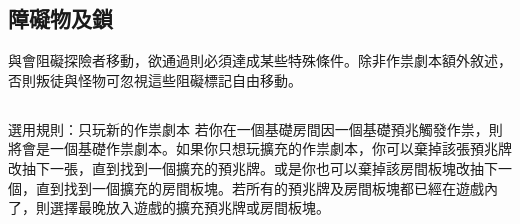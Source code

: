 
\subsection{障礙物及鎖}

與會阻礙探險者移動，欲通過則必須達成某些特殊條件。除非作祟劇本額外敘述，否則叛徒與怪物可忽視這些阻礙標記自由移動。


\subsection*{}

\begin{RuleBox}{選用規則：只玩新的作祟劇本}
  若你在一個基礎房間因一個基礎預兆觸發作祟，則將會是一個基礎作祟劇本。如果你只想玩擴充的作祟劇本，你可以棄掉該張預兆牌改抽下一張，直到找到一個擴充的預兆牌。或是你也可以棄掉該房間板塊改抽下一個，直到找到一個擴充的房間板塊。若所有的預兆牌及房間板塊都已經在遊戲內了，則選擇最晚放入遊戲的擴充預兆牌或房間板塊。
\end{RuleBox}
